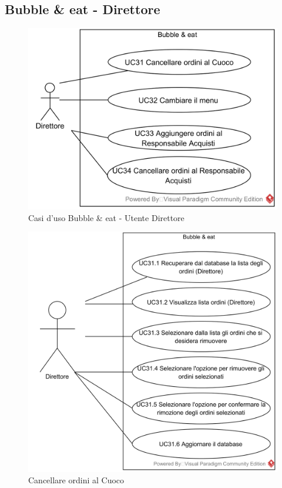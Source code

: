 \subsection{Bubble \& eat - Direttore}
\begin{figure}[H]
	\centering
	\includegraphics[width=15cm]{./Diagrammi_img/usecase/uc_bubble_direttore.png}
	\caption{Casi d'uso Bubble \& eat - Utente Direttore}
\end{figure}


\begin{figure}[H]
	\centering
	\includegraphics[width=15cm]{../../documenti/AnalisiDeiRequisiti/Diagrammi_img/usecase/uc3_12.png}
	\caption{\UCCaption{} Cancellare ordini al Cuoco}
\end{figure}

